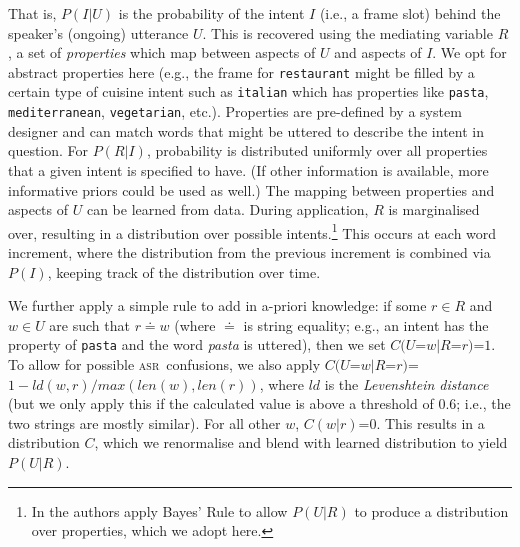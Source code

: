 \documentclass[11pt]{article}
\newcommand{\asr}[0]{\textsc{asr}}
\begin{document}
That is, $P(I|U)$ is the probability of the intent $I$ (i.e., a frame slot) behind the speaker's (ongoing) utterance $U$. This is recovered using the mediating variable $R$, a set of \emph{properties} which map between aspects of $U$ and aspects of $I$. We opt for abstract properties here (e.g., the frame for \texttt{restaurant} might be filled by a certain type of cuisine intent such as \texttt{italian} which has properties like \texttt{pasta}, \texttt{mediterranean}, \texttt{vegetarian}, etc.). Properties are pre-defined by a system designer and can match words that might be uttered to describe the intent in question. For $P(R|I)$, probability is distributed uniformly over all properties that a given intent is specified to have. (If other information is available, more informative priors could be used as well.) The mapping between properties and aspects of $U$ can be learned from data. During application, $R$ is marginalised over, resulting in a distribution over possible intents.\footnote{In  the authors apply Bayes' Rule to allow $P(U|R)$ to produce a distribution over properties, which we adopt here.} This occurs at each word increment, where the distribution from the previous increment is combined via $P(I)$, keeping track of the distribution over time. 


We  further apply a simple rule to add in a-priori knowledge: if some $r\in R$ and $w \in U$ are such that $r\doteq w$  (where $\doteq$ is string equality; e.g., an intent has the property of \texttt{pasta} and the word \emph{pasta} is uttered), then we set $C(U$=$w|R$=$r)$=$1$. To allow for possible \asr\ confusions, we also apply $C(U$=$w|R$=$r)$= $1 - ld(w,r) / max(len(w),len(r))$, where $ld$ is the \emph{Levenshtein distance} (but we only apply this if the calculated value is above a threshold of 0.6; i.e., the two strings are mostly similar). For all other $w$, $C(w|r)$=$0$. This results in a distribution $C$, which we renormalise and blend with learned distribution to yield $P(U|R)$. 
\end{document}
